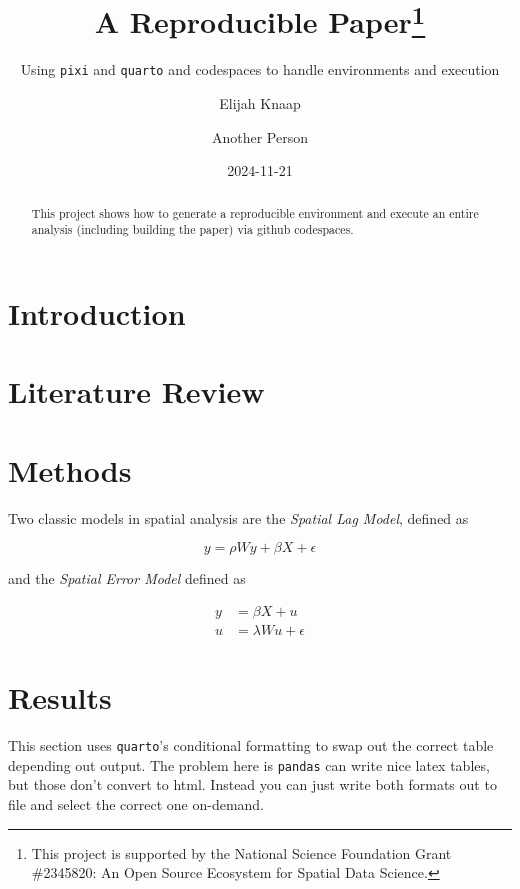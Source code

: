 \documentclass[
  letterpaper,
  DIV=11,
  numbers=noendperiod]{scrartcl}
\title{A Reproducible Paper\thanks{This project is supported by the
National Science Foundation Grant \#2345820: An Open Source Ecosystem
for Spatial Data Science.}}
\subtitle{Using \texttt{pixi} and \texttt{quarto} and codespaces to
handle environments and execution}
\author{Elijah Knaap \and Another Person}
\date{2024-11-21}
\begin{document}
\maketitle
\begin{abstract}
This project shows how to generate a reproducible environment and
execute an entire analysis (including building the paper) via github
codespaces.
\end{abstract}


\section{Introduction}\label{introduction}

\section{Literature Review}\label{literature-review}

\section{Methods}\label{methods}

Two classic models in spatial analysis are the \emph{Spatial Lag Model},
defined as

\[y = \rho Wy + \beta X + \epsilon\]

and the \emph{Spatial Error Model} defined as

\[
\begin{split}
y & = \beta X + u\\
u & = \lambda W u + \epsilon
\end{split}
\]

\section{Results}\label{results}

This section uses \texttt{quarto}'s conditional formatting to swap out
the correct table depending out output. The problem here is
\texttt{pandas} can write nice latex tables, but those don't convert to
html. Instead you can just write both formats out to file and select the
correct one on-demand.
\end{document}
